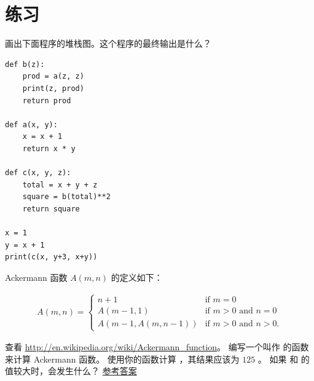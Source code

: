 \section{练习}

\begin{exercise}


画出下面程序的堆栈图。这个程序的最终输出是什么？

\begin{lstlisting}
def b(z):
    prod = a(z, z)
    print(z, prod)
    return prod

def a(x, y):
    x = x + 1
    return x * y

def c(x, y, z):
    total = x + y + z
    square = b(total)**2
    return square

x = 1
y = x + 1
print(c(x, y+3, x+y))
\end{lstlisting}

\end{exercise}


\begin{exercise}
\label{ackermann}


Ackermann 函数 $A(m, n)$ 的定义如下：


\begin{eqnarray*}
A(m, n) = \begin{cases}
              n+1 & \mbox{if } m = 0 \\
        A(m-1, 1) & \mbox{if } m > 0 \mbox{ and } n = 0 \\
A(m-1, A(m, n-1)) & \mbox{if } m > 0 \mbox{ and } n > 0.
\end{cases}
\end{eqnarray*}

%

查看 \url{http://en.wikipedia.org/wiki/Ackermann_function}。
编写一个叫作  的函数来计算 Ackermann 函数。
使用你的函数计算 ，其结果应该为 $125$ 。
如果  和  的值较大时，会发生什么？
\href{http://thinkpython2.com/code/ackermann.py}{参考答案}
  

\end{exercise}


